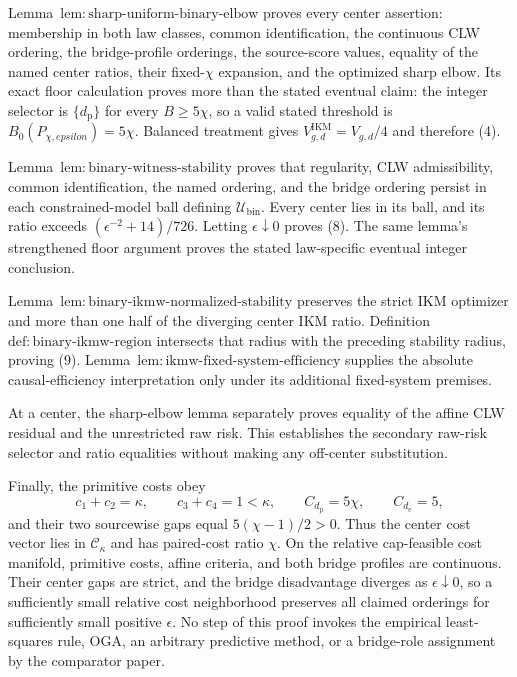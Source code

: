 Lemma~\(\mathrm{lem{:}sharp\text{-}uniform\text{-}binary\text{-}elbow}\) proves every center assertion: membership in both law classes, common identification, the continuous CLW ordering, the bridge-profile orderings, the source-score values, equality of the named center ratios, their fixed-\(\chi\) expansion, and the optimized sharp elbow.  Its exact floor calculation proves more than the stated eventual claim: the integer selector is \(\{d_{\mathrm p}\}\) for every \(B\ge5\chi\), so a valid stated threshold is \(B_0(P_{\chi,epsilon})=5\chi\).  Balanced treatment gives \(V_{g,d}^{\mathrm{IKM}}=V_{g,d}/4\) and therefore (4).

Lemma~\(\mathrm{lem{:}binary\text{-}witness\text{-}stability}\) proves that regularity, CLW admissibility, common identification, the named ordering, and the bridge ordering persist in each constrained-model ball defining \(\mathcal U_{\mathrm{bin}}\).  Every center lies in its ball, and its ratio exceeds \((\epsilon^{-2}+14)/726\).  Letting \(\epsilon\downarrow0\) proves (8).  The same lemma's strengthened floor argument proves the stated law-specific eventual integer conclusion.

Lemma~\(\mathrm{lem{:}binary\text{-}ikmw\text{-}normalized\text{-}stability}\) preserves the strict IKM optimizer and more than one half of the diverging center IKM ratio.  Definition~\(\mathrm{def{:}binary\text{-}ikmw\text{-}region}\) intersects that radius with the preceding stability radius, proving (9).  Lemma~\(\mathrm{lem{:}ikmw\text{-}fixed\text{-}system\text{-}efficiency}\) supplies the absolute causal-efficiency interpretation only under its additional fixed-system premises.

At a center, the sharp-elbow lemma separately proves equality of the affine CLW residual and the unrestricted raw risk.  This establishes the secondary raw-risk selector and ratio equalities without making any off-center substitution.

Finally, the primitive costs obey
\[
 c_1+c_2=\kappa,
 \qquad c_3+c_4=1<\kappa,
 \qquad C_{d_{\mathrm p}}=5\chi,
 \qquad C_{d_{\mathrm e}}=5,
\]
and their two sourcewise gaps equal \(5(\chi-1)/2>0\).  Thus the center cost vector lies in \(\mathcal C_\kappa\) and has paired-cost ratio \(\chi\).  On the relative cap-feasible cost manifold, primitive costs, affine criteria, and both bridge profiles are continuous.  Their center gaps are strict, and the bridge disadvantage diverges as \(\epsilon\downarrow0\), so a sufficiently small relative cost neighborhood preserves all claimed orderings for sufficiently small positive \(\epsilon\).  No step of this proof invokes the empirical least-squares rule, OGA, an arbitrary predictive method, or a bridge-role assignment by the comparator paper.